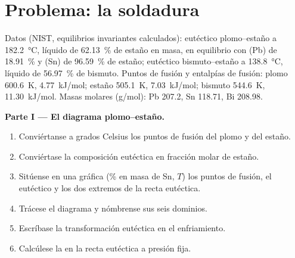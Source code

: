 \section{Problema: la soldadura}

\begin{problem}
\label{pb:b2:solid-liquid-diagrams:1}
Datos (NIST, equilibrios invariantes calculados): eutéctico plomo--estaño a
\qty{182.2}{\degreeCelsius}, líquido de 62.13~\% de estaño en masa, en equilibrio con
(Pb) de 18.91~\% y (Sn) de 96.59~\% de estaño; eutéctico bismuto--estaño a
\qty{138.8}{\degreeCelsius}, líquido de 56.97~\% de bismuto. Puntos de fusión y
entalpías de fusión: plomo \qty{600.6}{K}, \qty{4.77}{kJ/mol}; estaño
\qty{505.1}{K}, \qty{7.03}{kJ/mol}; bismuto \qty{544.6}{K}, \qty{11.30}{kJ/mol}.
Masas molares (\unit{g/mol}): Pb 207.2, Sn 118.71, Bi 208.98.

\medskip
\noindent\textbf{Parte I --- El diagrama plomo--estaño.}
\begin{enumerate}
  \item Conviértanse a grados Celsius los puntos de fusión del plomo y del estaño.
  \item Conviértase la composición eutéctica en fracción molar de estaño.
  \item Sitúense en una gráfica (\% en masa de Sn, $T$) los puntos de fusión, el eutéctico y
        los dos extremos de la recta eutéctica.
  \item Trácese el diagrama y nómbrense sus seis dominios.
  \item Escríbase la transformación eutéctica en el enfriamiento.
  \item Calcúlese la  en la recta eutéctica a presión fija.
\end{enumerate}


\end{problem}

